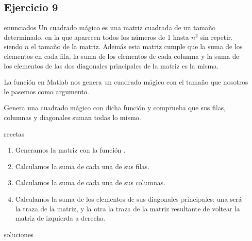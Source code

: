 \subsection{Ejercicio 9}
\def\parte{enunciados}
\ifx\capitulo\parte
Un cuadrado mágico es una matriz cuadrada de un tamaño determinado, en la que aparecen todos los números de 1 hasta $n^2$ sin repetir, siendo $n$ el tamaño de la matriz. Además esta matriz cumple que la suma de los elementos en cada fila, la suma de los elementos de cada columna y la suma de los elementos de las dos diagonales principales de la matriz es la misma.

La función  en Matlab nos genera un cuadrado mágico con el tamaño que nosotros le pasemos como argumento.

Genera una cuadrado mágico con dicha función y comprueba que sus filas, columnas y diagonales suman todas lo mismo.
\fi

\def\parte{recetas}
\ifx\capitulo\parte
\begin{enumerate}
\item Generamos la matriz con la función .
\item Calculamos la suma de cada una de sus filas.
\item Calculamos la suma de cada una de sus columnas.
\item Calculamos la suma de los elementos de sus diagonales principales: una será la traza de la matriz, y la otra la traza de la matriz resultante de voltear la matriz de izquierda a derecha.
\end{enumerate}
\fi

\def\parte{soluciones}
\ifx\capitulo\parte

\fi
